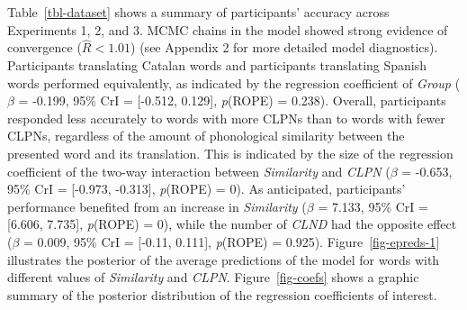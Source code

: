 \documentclass[
]{article}
\begin{document}
Table~\ref{tbl-dataset} shows a summary of participants' accuracy across
Experiments 1, 2, and 3. MCMC chains in the model showed strong evidence
of convergence (\(\hat{R}<1.01\)) (see Appendix 2 for more detailed
model diagnostics). Participants translating Catalan words and
participants translating Spanish words performed equivalently, as
indicated by the regression coefficient of \emph{Group} (\(\beta\) =
-0.199, 95\% CrI = {[}-0.512, 0.129{]}, \emph{p}(ROPE) = 0.238).
Overall, participants responded less accurately to words with more CLPNs
than to words with fewer CLPNs, regardless of the amount of phonological
similarity between the presented word and its translation. This is
indicated by the size of the regression coefficient of the two-way
interaction between \emph{Similarity} and \emph{CLPN} (\(\beta\) =
-0.653, 95\% CrI = {[}-0.973, -0.313{]}, \emph{p}(ROPE) = 0). As
anticipated, participants' performance benefited from an increase in
\emph{Similarity} (\(\beta\) = 7.133, 95\% CrI = {[}6.606, 7.735{]},
\emph{p}(ROPE) = 0), while the number of \emph{CLND} had the opposite
effect (\(\beta\) = 0.009, 95\% CrI = {[}-0.11, 0.111{]}, \emph{p}(ROPE)
= 0.925). Figure~\ref{fig-epreds-1} illustrates the posterior of the
average predictions of the model for words with different values of
\emph{Similarity} and \emph{CLPN}. Figure~\ref{fig-coefs} shows a
graphic summary of the posterior distribution of the regression
coefficients of interest.
\end{document}
